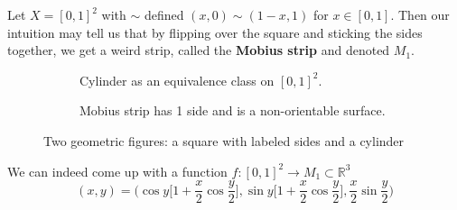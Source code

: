     \begin{example} 
      Let $X = [0, 1]^2$ with $\sim$ defined $(x, 0) \sim (1-x, 1)$ for $x \in [0, 1]$. Then our intuition may tell us that by flipping over the square and sticking the sides together, we get a weird strip, called the \textbf{Mobius strip} and denoted $M_1$.  

      \begin{figure}[H]
        \centering
        \begin{subfigure}[b]{0.48\textwidth}
          \centering
          \caption{Cylinder as an equivalence class on $[0, 1]^2$.}
          \label{fig:mobius_equiv}
        \end{subfigure}
        \hfill 
        \begin{subfigure}[b]{0.48\textwidth}
          \centering 
          \caption{Mobius strip has 1 side and is a non-orientable surface.} 
          \label{fig:mobius_strip_r3}
        \end{subfigure}
        \caption{Two geometric figures: a square with labeled sides and a cylinder}
        \label{fig:mobius_strip}
      \end{figure}

      We can indeed come up with a function $f: [0, 1]^2 \rightarrow M_1 \subset \mathbb{R}^3$ 
      \begin{equation}
        (x, y) = \bigg( \cos{y} \Big[ 1 + \frac{x}{2} \cos{\frac{y}{2}} \Big], \sin{y} \Big[ 1 + \frac{x}{2} \cos{\frac{y}{2}} \Big], \frac{x}{2} \sin \frac{y}{2} \bigg)
      \end{equation}
    \end{example}

